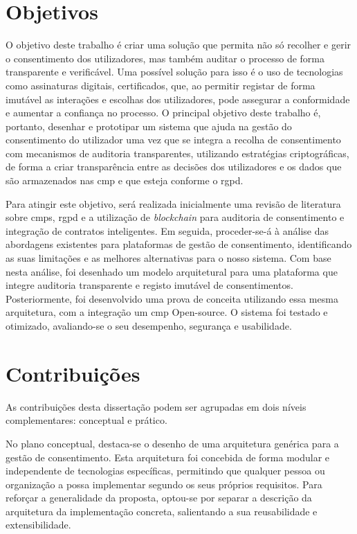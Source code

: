\section{Objetivos}

O objetivo deste trabalho é criar uma solução que permita não só recolher e gerir o consentimento dos utilizadores, mas também auditar o processo de forma transparente e verificável. 
Uma possível solução para isso é o uso de tecnologias como assinaturas digitais, certificados, que, ao permitir registar de forma imutável as interações e escolhas dos utilizadores, pode assegurar a conformidade e aumentar a confiança no processo. O principal objetivo deste trabalho é, portanto, desenhar e prototipar um sistema que ajuda na gestão do consentimento do utilizador uma vez que se integra a recolha de consentimento com mecanismos de auditoria transparentes, utilizando estratégias criptográficas, de forma a criar transparência entre as decisões dos utilizadores e os dados que são armazenados nas \acrshort{cmp} e que esteja conforme o \acrshort{rgpd}.

Para atingir este objetivo, será realizada inicialmente uma revisão de literatura sobre \acrshort{cmp}s, \acrshort{rgpd} e a utilização de \textit{blockchain} para auditoria de consentimento e integração de contratos inteligentes. Em seguida, proceder-se-á à análise das abordagens existentes para plataformas de gestão de consentimento, identificando as suas limitações e as melhores alternativas para o nosso sistema. Com base nesta análise, foi desenhado um modelo arquitetural para uma plataforma que integre auditoria transparente e registo imutável de consentimentos. Posteriormente, foi desenvolvido uma prova de conceita utilizando essa mesma arquitetura, com a integração um \acrshort{cmp} Open-source. O sistema foi testado e otimizado, avaliando-se o seu desempenho, segurança e usabilidade.

\section{Contribuições}

As contribuições desta dissertação podem ser agrupadas em dois níveis complementares: conceptual e prático. 

No plano conceptual, destaca-se o desenho de uma arquitetura genérica para a gestão de consentimento. Esta arquitetura foi concebida de forma modular e independente de tecnologias específicas, permitindo que qualquer pessoa ou organização a possa implementar segundo os seus próprios requisitos. Para reforçar a generalidade da proposta, optou-se por separar a descrição da arquitetura da implementação concreta, salientando a sua reusabilidade e extensibilidade.

